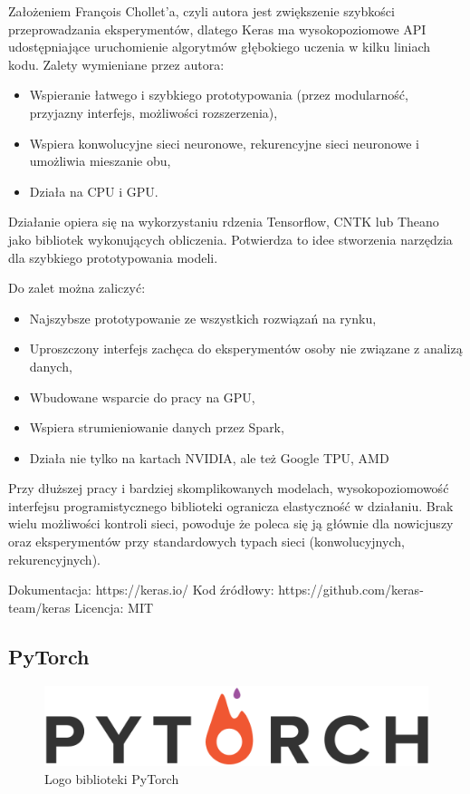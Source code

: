 \documentclass[12pt,a4paper,twoside,titlepage,openright]{book}
\begin{document}
Założeniem François Chollet'a, czyli autora jest zwiększenie szybkości przeprowadzania eksperymentów, dlatego Keras ma wysokopoziomowe API udostępniające uruchomienie algorytmów głębokiego uczenia w kilku liniach kodu. Zalety wymieniane przez autora:
\begin{itemize}
\item Wspieranie łatwego i szybkiego prototypowania (przez modularność, przyjazny interfejs, możliwości rozszerzenia),
\item Wspiera konwolucyjne sieci neuronowe, rekurencyjne sieci neuronowe i umożliwia mieszanie obu,
\item Działa na CPU i GPU.
\end{itemize}

Działanie opiera się na wykorzystaniu rdzenia Tensorflow, CNTK lub Theano jako bibliotek wykonujących obliczenia. Potwierdza to idee stworzenia narzędzia dla szybkiego prototypowania modeli. \cite{bookDeepLearningKeras}

Do zalet można zaliczyć:
\begin{itemize}
\item Najszybsze prototypowanie ze wszystkich rozwiązań na rynku,
\item Uproszczony interfejs zachęca do eksperymentów osoby nie związane z analizą danych,
\item Wbudowane wsparcie do pracy na GPU,
\item Wspiera strumieniowanie danych przez Spark,
\item Działa nie tylko na kartach NVIDIA, ale też Google TPU, AMD
\end{itemize}

Przy dłuższej pracy i bardziej skomplikowanych modelach, wysokopoziomowość interfejsu programistycznego biblioteki ogranicza elastyczność w działaniu. Brak wielu możliwości kontroli sieci, powoduje że poleca się ją głównie dla nowicjuszy oraz eksperymentów przy standardowych typach sieci (konwolucyjnych, rekurencyjnych).

\noindent
\newline 
Dokumentacja: https://keras.io/
\newline 
Kod źródłowy: https://github.com/keras-team/keras
\newline 
Licencja: MIT

\subsection{PyTorch}
\begin{figure}[ht]
	\centering
			\includegraphics[resolution=100, scale=0.5]{PyTorch.png}
		\caption{Logo biblioteki PyTorch}
\end{figure}
\end{document}

